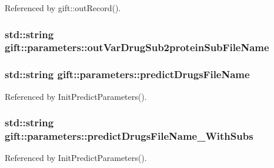 Referenced by gift\+::out\+Record().

\subsubsection[{\texorpdfstring{out\+Var\+Drug\+Sub2protein\+Sub\+File\+Name}{outVarDrugSub2proteinSubFileName}}]{\setlength{\rightskip}{0pt plus 5cm}std\+::string gift\+::parameters\+::out\+Var\+Drug\+Sub2protein\+Sub\+File\+Name}\hypertarget{classgift_1_1parameters_a1d5bd85d510a847e22e47e2bdebebf39}{}\label{classgift_1_1parameters_a1d5bd85d510a847e22e47e2bdebebf39}
\subsubsection[{\texorpdfstring{predict\+Drugs\+File\+Name}{predictDrugsFileName}}]{\setlength{\rightskip}{0pt plus 5cm}std\+::string gift\+::parameters\+::predict\+Drugs\+File\+Name}\hypertarget{classgift_1_1parameters_ac19aca119982c0f318958d6d5744bec0}{}\label{classgift_1_1parameters_ac19aca119982c0f318958d6d5744bec0}


Referenced by Init\+Predict\+Parameters().

\subsubsection[{\texorpdfstring{predict\+Drugs\+File\+Name\+\_\+\+With\+Subs}{predictDrugsFileName\_WithSubs}}]{\setlength{\rightskip}{0pt plus 5cm}std\+::string gift\+::parameters\+::predict\+Drugs\+File\+Name\+\_\+\+With\+Subs}\hypertarget{classgift_1_1parameters_ad28f2340e58e3f081edd6541fac12e10}{}\label{classgift_1_1parameters_ad28f2340e58e3f081edd6541fac12e10}


Referenced by Init\+Predict\+Parameters().

